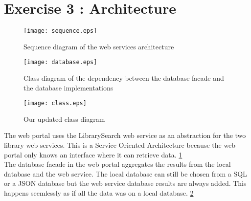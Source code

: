 \section{Exercise 3 : Architecture}
    \begin{figure}[p]
      \texttt{[image: sequence.eps]}
      \caption{\label{fig:sequence}Sequence diagram of the web services architecture}
    \end{figure}

    \begin{figure}[p]
      \texttt{[image: database.eps]}
      \caption{\label{fig:database}Class diagram of the dependency between the database facade and the database implementations}
    \end{figure}

    \begin{figure}[p]
      \texttt{[image: class.eps]}
      \caption{\label{fig:class} Our updated class diagram}
    \end{figure}

    The web portal uses the LibrarySearch web service as an abstraction for the two library web services. This is a Service Oriented Architecture because the web portal only knows an interface where it can retrieve data. \ref{fig:sequence} \\
    The database facade in the web portal aggregates the results from the local database and the web service. The local database can still be chosen from a SQL or a JSON database but the web service database results are always added. This happens seemlessly as if all the data was on a local database. \ref{fig:database}
